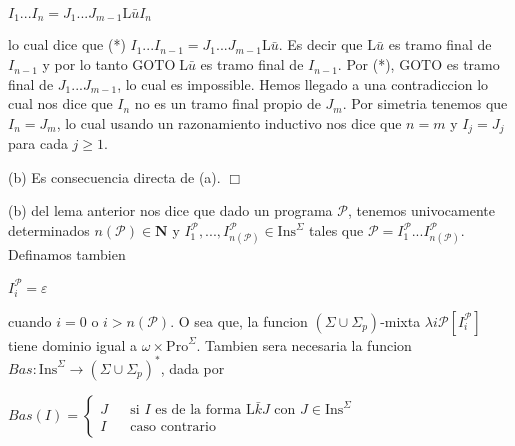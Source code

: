 \(\displaystyle I_{1}...I_{n}=J_{1}...J_{m-1}\mathrm{L}\bar{u}I_{n} \)

lo cual dice que
(*) \(I_{1}...I_{n-1}=J_{1}...J_{m-1}\mathrm{L}\bar{u}.\)
Es decir que \(\mathrm{L}\bar{u}\) es tramo final de \(I_{n-1}\) y por lo tanto \(\mathrm{GOTO}\;\mathrm{L}\bar{u}\) es tramo final de \(I_{n-1}.\) Por (*), \(\mathrm{GOTO}\) es tramo final de \(J_{1}...J_{m-1}\), lo cual es impossible. Hemos llegado a una contradiccion lo cual nos dice que \(I_{n}\) no es un tramo final propio de \(J_{m}.\) Por simetria tenemos que \( I_{n}=J_{m} \), lo cual usando un razonamiento inductivo nos dice que \(n=m\) y \(I_{j}=J_{j} \) para cada \(j\geq 1\).

(b) Es consecuencia directa de (a). \(\Box\)

(b) del lema anterior nos dice que dado un programa \(\mathcal{P}\), tenemos univocamente determinados \(n(\mathcal{P})\in \mathbf{N}\) y \(I_{1}^{\mathcal{P }},...,I_{n(\mathcal{P})}^{\mathcal{P}}\in \mathrm{Ins}^{\Sigma }\) tales que \(\mathcal{P}=I_{1}^{\mathcal{P}}...I_{n(\mathcal{P})}^{\mathcal{P}}\). Definamos tambien

\(\displaystyle I_{i}^{\mathcal{P}}=\varepsilon \)

cuando \(i=0\) o \(i >n(\mathcal{P})\). O sea que, la funcion \((\Sigma \cup \Sigma _{p})\)-mixta \(\lambda i\mathcal{P}\left[ I_{i}^{\mathcal{P}}\right] \) tiene dominio igual a \(\omega \times \mathrm{Pro}^{\Sigma }\).
Tambien sera necesaria la funcion \(Bas:\mathrm{Ins}^{\Sigma }\rightarrow (\Sigma \cup \Sigma _{p})^{\ast }\), dada por

\(\displaystyle Bas(I)=\left\{ \begin{array}{ccl} J & & \text{si }I\text{ es de la forma }\mathrm{L}\bar{k}J\text{ con }J\in \mathrm{Ins}^{\Sigma } \\ I & & \text{caso contrario} \end{array} \right. \)
